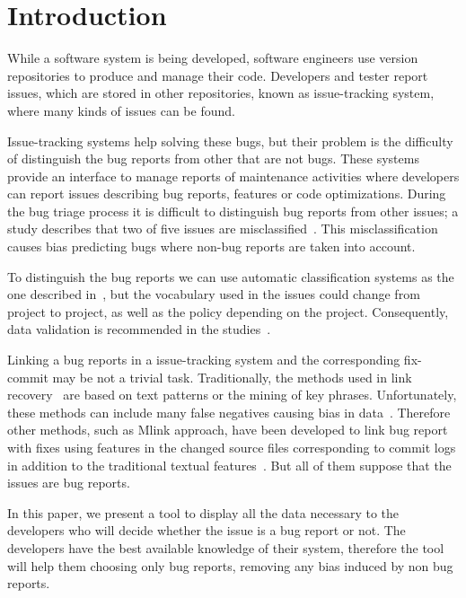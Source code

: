 \documentclass[ifip]{svmult}
\begin{document}
\section{Introduction}
\label{sec:1}


While a software system is being developed, software engineers use version repositories to produce and manage their code. Developers and tester report issues, which are stored in other repositories, known as issue-tracking system, where many kinds of issues can be found.

Issue-tracking systems help solving these bugs, but their problem is the difficulty of distinguish the bug reports from other that are not bugs. These systems provide an interface to manage reports of maintenance activities where developers can report issues describing bug reports, features or code optimizations. During the bug triage process it is difficult to distinguish bug reports from other issues; a study describes that two of five issues are misclassified~\cite{Herzig}. This misclassification causes bias predicting bugs where non-bug reports are taken into account.

To distinguish the bug reports we can use automatic classification systems as the one described in~\cite{Antoniol}, but the vocabulary used in the issues could change from project to project, as well as the policy depending on the project. Consequently, data validation is recommended in the studies~\cite{Herzig}.

Linking a bug reports in a issue-tracking system and the corresponding fix-commit may be not a trivial task. Traditionally, the methods used in link recovery~\cite{Zimmermann, Thomas} are based on text patterns or the mining of key phrases. Unfortunately, these methods can include many false negatives causing bias in data~\cite{Bird, NguyenTH}. Therefore other methods, such as Mlink approach, have been developed to link bug report with fixes using features in the changed source files corresponding to commit logs in addition to the traditional textual features~\cite{Nguyen}. But all of them suppose that the issues are bug reports.

In this paper, we present a tool to display all the data necessary to the developers who will decide whether the issue is a bug report or not. The developers have the best available knowledge of their system, therefore the tool will help them choosing only bug reports, removing any bias induced by non bug reports.
\end{document}
